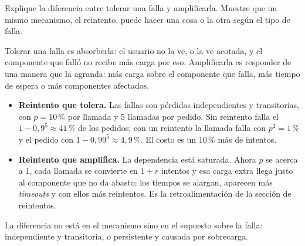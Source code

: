 \documentclass[variant=guia,cover=institutional,mode=screen]{ua-engineering-v6-article}
\begin{document}
\begin{uaexercise}
Explique la diferencia entre tolerar una falla y amplificarla. Muestre que un mismo mecanismo, el reintento, puede hacer una cosa o la otra según el tipo de falla.
\end{uaexercise}
\begin{uaanswer}
Tolerar una falla es absorberla: el usuario no la ve, o la ve acotada, y el componente que falló no recibe más carga por eso. Amplificarla es responder de una manera que la agranda: más carga sobre el componente que falla, más tiempo de espera o más componentes afectados.

\begin{itemize}
\item \textbf{Reintento que tolera.} Las fallas son pérdidas independientes y transitorias, con $p = 10\,\%$ por llamada y 5 llamadas por pedido. Sin reintento falla el $1 - 0{,}9^5 \approx 41\,\%$ de los pedidos; con un reintento la llamada falla con $p^2 = 1\,\%$ y el pedido con $1 - 0{,}99^5 \approx 4{,}9\,\%$. El costo es un 10\,\% más de intentos.
\item \textbf{Reintento que amplifica.} La dependencia está saturada. Ahora $p$ se acerca a 1, cada llamada se convierte en $1 + r$ intentos y esa carga extra llega justo al componente que no da abasto: los tiempos se alargan, aparecen más \emph{timeouts} y con ellos más reintentos. Es la retroalimentación de la sección de reintentos.
\end{itemize}
La diferencia no está en el mecanismo sino en el supuesto sobre la falla: independiente y transitoria, o persistente y causada por sobrecarga.
\end{uaanswer}
\end{document}
